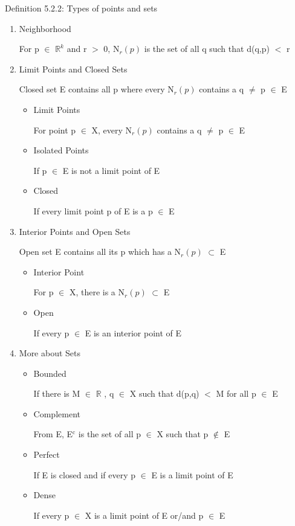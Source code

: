 { \color{blue} Definition 5.2.2: Types of points and sets } 
	\begin{enumerate}[label=(\alph*), leftmargin=2cm]
		\item {\color{lblue} Neighborhood}

			\qquad For p $\in$ $\mathbb{R}^k$ and r $>$ 0, N$_r(p)$ is the set of all q
			such that d(q,p) $<$ r

		\item {\color{lblue} Limit Points and Closed Sets}

			\qquad Closed set E contains all p where every N$_r(p)$ contains
			a q $\neq$ p $\in$ E
			\begin{itemize}[leftmargin=1cm]
				\item Limit Points 

					\qquad For point p $\in$ X, every N$_r(p)$ contains a
					q $\neq$ p $\in$ E
				
				\item Isolated Points

					\qquad If p $\in$ E is not a limit point of E

				\item Closed

					\qquad If every limit point p of E is a p $\in$ E
			\end{itemize}

		\item {\color{lblue} Interior Points and Open Sets}

			\qquad Open set E contains all its p which has a N$_r(p)$ $\subset$ E
			\begin{itemize}[leftmargin=1cm]
				\item Interior Point

					\qquad For p $\in$ X, there is a N$_r(p)$ $\subset$ E

				\item Open

					\qquad If every p $\in$ E is an interior point of E
			\end{itemize}

		\item {\color{lblue} More about Sets}
			\begin{itemize}[leftmargin=1cm]
				\item Bounded

					\qquad If there is M $\in$ $\mathbb{R}$ , q $\in$ X such that d(p,q) $<$ M
					for all p $\in$ E

				\item Complement

					\qquad From E, E$^\text{c}$ is the set of all p $\in$ X such that p $\not \in$ E

				\item Perfect

					\qquad If E is closed and if every p $\in$ E is a limit point of E

				\item Dense

					\qquad If every p $\in$ X is a limit point of E or/and p $\in$ E
			\end{itemize}
	\end{enumerate}

